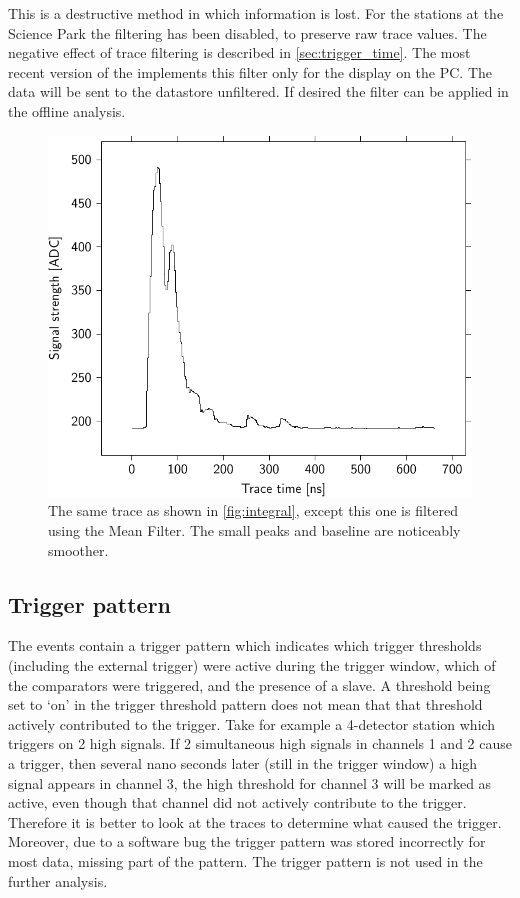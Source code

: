 This is a destructive method in which information is lost. For the \hisparc stations at the Science Park the filtering has been disabled, to preserve raw trace values. The negative effect of trace filtering is described in \cref{sec:trigger_time}. The most recent version of the \hisparc \daq implements this filter only for the display on the \hisparc PC. The data will be sent to the datastore unfiltered. If desired the filter can be applied in the offline analysis.

\begin{figure}
    \centering
    \includegraphics[width=0.7\linewidth]{plots/processing/mean_filter}
    \caption{The same trace as shown in \cref{fig:integral}, except this one is filtered using the Mean Filter. The small peaks and baseline are noticeably smoother.}
    \label{fig:mean_filter}
\end{figure}


\subsection{Trigger pattern}

The \hisparc events contain a trigger pattern which indicates which trigger thresholds (including the external trigger) were active during the trigger window, which of the comparators were triggered, and the presence of a slave. A threshold being set to `on' in the trigger threshold pattern does not mean that that threshold actively contributed to the trigger. Take for example a 4-detector station which triggers on 2 high signals. If 2 simultaneous high signals in channels 1 and 2 cause a trigger, then several nano seconds later (still in the trigger window) a high signal appears in channel 3, the high threshold for channel 3 will be marked as active, even though that channel did not actively contribute to the trigger. Therefore it is better to look at the traces to determine what caused the trigger. Moreover, due to a software bug the trigger pattern was stored incorrectly for most data, missing part of the pattern. The trigger pattern is not used in the further analysis.


